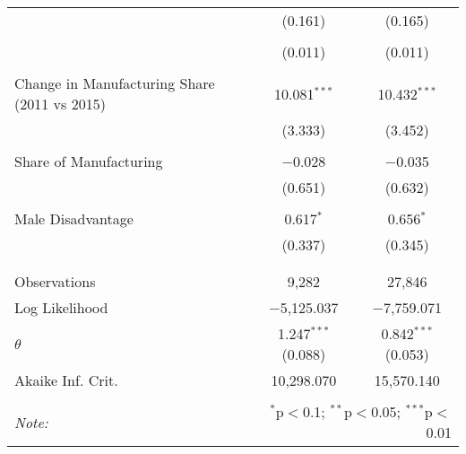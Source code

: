 \begin{table}[!htbp]
\begin{tabular}{@{\extracolsep{5pt}}lcc}
  & (0.161) & (0.165) \\ 
  & & \\ 
  & (0.011) & (0.011) \\ 
  & & \\ 
 Change in Manufacturing Share (2011 vs 2015) & 10.081$^{***}$ & 10.432$^{***}$ \\ 
  & (3.333) & (3.452) \\ 
  & & \\ 
 Share of Manufacturing & $-$0.028 & $-$0.035 \\ 
  & (0.651) & (0.632) \\ 
  & & \\ 
 Male Disadvantage & 0.617$^{*}$ & 0.656$^{*}$ \\ 
  & (0.337) & (0.345) \\ 
  & & \\ 
\hline \\[-1.8ex] 
Observations & 9,282 & 27,846 \\ 
Log Likelihood & $-$5,125.037 & $-$7,759.071 \\ 
$\theta$ & 1.247$^{***}$  (0.088) & 0.842$^{***}$  (0.053) \\ 
Akaike Inf. Crit. & 10,298.070 & 15,570.140 \\ 
\hline 
\hline \\[-1.8ex] 
\textit{Note:}  & \multicolumn{2}{r}{$^{*}$p$<$0.1; $^{**}$p$<$0.05; $^{***}$p$<$0.01} \\ 
\end{tabular} 
\end{table} 
